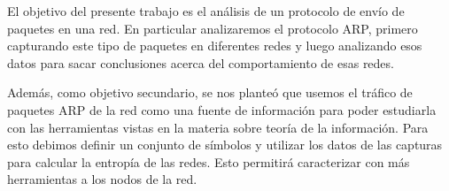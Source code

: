 El objetivo del presente trabajo es el análisis de un protocolo de envío de
paquetes en una red. En particular analizaremos el protocolo ARP, primero
capturando este tipo de paquetes en diferentes redes y luego analizando esos
datos para sacar conclusiones acerca del comportamiento de esas redes.

Además, como objetivo secundario, se nos planteó que usemos el tráfico de
paquetes ARP de la red como una fuente de información para poder estudiarla
con las herramientas vistas en la materia sobre teoría de la información. Para
esto debimos definir un conjunto de símbolos y utilizar los datos de las
capturas para calcular la entropía de las redes. Esto permitirá caracterizar
con más herramientas a los nodos de la red.